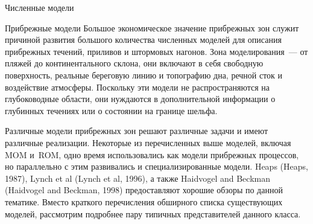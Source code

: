 \begin{chapter}{Численные модели}
\begin{section}{Прибрежные модели}\label{sec:CoastalModels}
Большое экономическое значение прибрежных зон служит причиной развития
большого количества численных моделей для описания прибрежных течений,
приливов и штормовых нагонов. Зона моделирования~--- от пляжей до
континентального склона, они включают в себя свободную поверхность,
реальные береговую линию и топографию дна, речной сток и воздействие
атмосферы. Поскольку эти модели не распространяются на глубоководные
области, они нуждаются в дополнительной информации о глубинных
течениях или о состоянии на границе шельфа.
%

Различные модели прибрежных зон решают различные задачи и имеют
различные реализации. Некоторые из перечисленных выше моделей, включая
MOM и~ROM, одно время использовались как модели прибрежных
процессов, но параллельно с этим развивались и специализированные
модели. Heaps (Heaps, 1987), Lynch et al (Lynch et al, 1996), 
а также Haidvogel and Beckman (Haidvogel and Beckman, 1998)
предоставляют хорошие обзоры по данной тематике. Вместо краткого перечисления
обширного списка существующих моделей, рассмотрим подробнее пару типичных
представителей данного класса.
%


\end{section}
\end{chapter}
